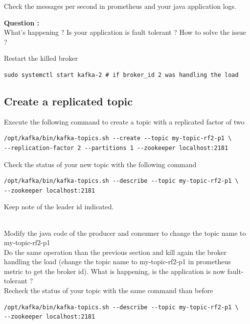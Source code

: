 \documentclass{article}
\newcounter{question}
\newenvironment{question}
    { \begin{mdframed}[backgroundcolor=gray!20] \textbf{Question \arabic{question} : } \stepcounter{question} \\}
    {  \end{mdframed}}
\newenvironment{code}
    { \begin{mdframed} }    {  \end{mdframed}}
\begin{document}
Check the messages per second in prometheus and your java application logs.

\begin{question}
 What's happening ? Is your application is fault tolerant ? How to solve the issue ? 
\end{question}


Restart the killed broker 
\begin{code}
    \begin{verbatim}
sudo systemctl start kafka-2 # if broker_id 2 was handling the load \end{verbatim}
\end{code}
\subsection{Create a replicated topic}
Execute the following command to create a topic with a replicated factor of two

\begin{code}
    \begin{verbatim}
/opt/kafka/bin/kafka-topics.sh --create --topic my-topic-rf2-p1 \
--replication-factor 2 --partitions 1 --zookeeper localhost:2181 \end{verbatim}
\end{code}


Check the status of your new topic with the following command
\begin{code}
    \begin{verbatim}
/opt/kafka/bin/kafka-topics.sh --describe --topic my-topic-rf2-p1 \
--zookeeper localhost:2181 \end{verbatim}
\end{code}

Keep note of the leader id indicated.


\\
Modify the java code of the producer and consumer to change the topic name to my-topic-rf2-p1
\\


Do the same operation than the previous section and kill again the broker handling the load (change the topic name to my-topic-rf2-p1 in prometheus metric to get the broker id). What is happening, is the application is now fault-tolerant ? 
\\


Recheck the status of your topic with the same command than before 
\begin{code}
    \begin{verbatim}
/opt/kafka/bin/kafka-topics.sh --describe --topic my-topic-rf2-p1 \
--zookeeper localhost:2181 \end{verbatim}
\end{code}
\end{document}

